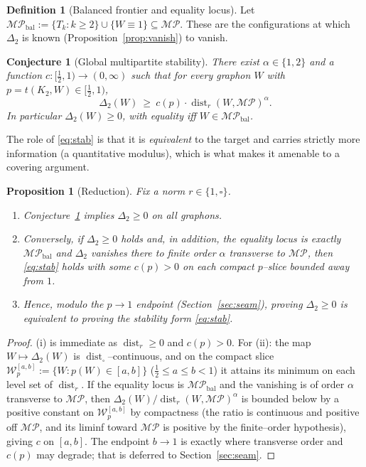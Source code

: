 \documentclass[11pt]{article}
\newtheorem{proposition}[theorem]{Proposition}
\newtheorem{conjecture}[theorem]{Conjecture}
\theoremstyle{definition}
\newtheorem{definition}[theorem]{Definition}
\newcommand{\dist}{\operatorname{dist}}
\newcommand{\MP}{\mathcal{MP}}
\newcommand{\Tk}{T_k}
\begin{document}
\begin{definition}[Balanced frontier and equality locus]\label{def:eqloc}
Let $\MP_{\mathrm{bal}}:=\{\Tk:k\ge2\}\cup\{W\equiv1\}\subseteq\MP$.  These are the
configurations at which $\Delta_2$ is known (Proposition~\ref{prop:vanish}) to
vanish.
\end{definition}

\begin{conjecture}[Global multipartite stability]\label{conj:stab}
There exist $\alpha\in\{1,2\}$ and a function $c:[\tfrac12,1)\to(0,\infty)$ such
that for every graphon $W$ with $p=t(K_2,W)\in[\tfrac12,1)$,
\begin{equation}\label{eq:stab}
  \Delta_2(W)\ \ge\ c(p)\cdot\dist_r(W,\MP)^{\alpha}.
\end{equation}
In particular $\Delta_2(W)\ge0$, with equality iff $W\in\MP_{\mathrm{bal}}$.
\end{conjecture}

The role of \eqref{eq:stab} is that it is \emph{equivalent} to the target and
carries strictly more information (a quantitative modulus), which is what makes it
amenable to a covering argument.

\begin{proposition}[Reduction]\label{prop:reduction}
Fix a norm $r\in\{1,\square\}$.
\begin{enumerate}[label=\textup{(\roman*)}]
\item Conjecture~\ref{conj:stab} implies $\Delta_2\ge0$ on all graphons.
\item Conversely, if $\Delta_2\ge0$ holds and, in addition, the equality locus is
exactly $\MP_{\mathrm{bal}}$ and $\Delta_2$ vanishes there to \emph{finite order}
$\alpha$ transverse to $\MP$, then \eqref{eq:stab} holds with some $c(p)>0$ on each
compact $p$--slice bounded away from $1$.
\item Hence, modulo the $p\to1$ endpoint (Section~\ref{sec:seam}), proving
$\Delta_2\ge0$ is \emph{equivalent} to proving the stability form \eqref{eq:stab}.
\end{enumerate}
\end{proposition}

\begin{proof}
(i) is immediate as $\dist_r\ge0$ and $c(p)>0$.  For (ii): the map
$W\mapsto\Delta_2(W)$ is $\dist_\square$--continuous, and on the compact slice
$\mathcal W_p^{[a,b]}:=\{W:p(W)\in[a,b]\}$ ($\tfrac12\le a\le b<1$) it attains its
minimum on each level set of $\dist_r$.  If the equality locus is $\MP_{\mathrm{bal}}$
and the vanishing is of order $\alpha$ transverse to $\MP$, then
$\Delta_2(W)/\dist_r(W,\MP)^\alpha$ is bounded below by a positive constant on
$\mathcal W_p^{[a,b]}$ by compactness (the ratio is continuous and positive off
$\MP$, and its liminf toward $\MP$ is positive by the finite--order hypothesis),
giving $c$ on $[a,b]$.  The endpoint $b\to1$ is exactly where transverse order and
$c(p)$ may degrade; that is deferred to Section~\ref{sec:seam}.
\end{proof}
\end{document}
